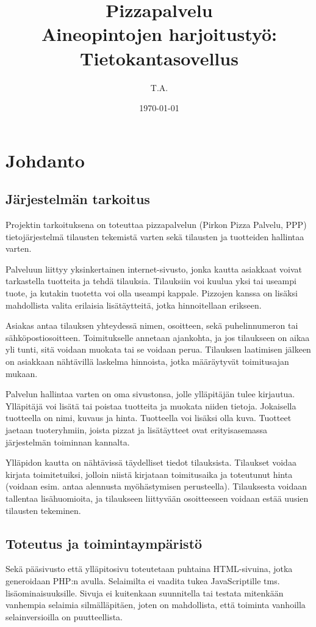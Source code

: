 \documentclass[a4paper, 12pt, finnish]{article}
\title{Pizzapalvelu\\
\large{Aineopintojen harjoitustyö: Tietokantasovellus}}
\author{T.A.}
\date{\today}
\begin{document}
\maketitle
\newpage

\section{Johdanto}
\subsection*{Järjestelmän tarkoitus}
Projektin tarkoituksena on toteuttaa pizzapalvelun (Pirkon Pizza Palvelu, PPP) tietojärjestelmä tilausten tekemistä varten sekä tilausten ja tuotteiden hallintaa varten.

Palveluun liittyy yksinkertainen internet-sivusto, jonka kautta asiakkaat voivat tarkastella tuotteita ja tehdä tilauksia. Tilauksiin voi kuulua yksi tai useampi tuote, ja kutakin tuotetta voi olla useampi kappale. Pizzojen kanssa on lisäksi mahdollista valita erilaisia lisätäytteitä, jotka hinnoitellaan erikseen.

Asiakas antaa tilauksen yhteydessä nimen, osoitteen, sekä puhelinnumeron tai sähköpostiosoitteen. Toimitukselle annetaan ajankohta, ja jos tilaukseen on aikaa yli tunti, sitä voidaan muokata tai se voidaan perua. Tilauksen laatimisen jälkeen on asiakkaan nähtävillä laskelma hinnoista, jotka määräytyvät toimitusajan mukaan.

Palvelun hallintaa varten on oma sivustonsa, jolle ylläpitäjän tulee kirjautua. Ylläpitäjä voi lisätä tai poistaa tuotteita ja muokata niiden tietoja. Jokaisella tuotteella on nimi, kuvaus ja hinta. Tuotteella voi lisäksi olla kuva. Tuotteet jaetaan tuoteryhmiin, joista pizzat ja lisätäytteet ovat erityisasemassa järjestelmän toiminnan kannalta.

Ylläpidon kautta on nähtävissä täydelliset tiedot tilauksista. Tilaukset voidaa kirjata toimitetuiksi, jolloin niistä kirjataan toimitusaika ja toteutunut hinta (voidaan esim. antaa alennusta myöhästymisen perusteella). Tilauksesta voidaan tallentaa lisähuomioita, ja tilaukseen liittyvään osoitteeseen voidaan estää uusien tilausten tekeminen.

\subsection*{Toteutus ja toimintaympäristö}

Sekä pääsivusto että ylläpitosivu toteutetaan puhtaina HTML-sivuina, jotka generoidaan PHP:n avulla. Selaimilta ei vaadita tukea JavaScriptille tms. lisäominaisuuksille. Sivuja ei kuitenkaan suunnitella tai testata mitenkään vanhempia selaimia silmälläpitäen, joten on mahdollista, että toiminta vanhoilla selainversioilla on puutteellista. 
\end{document}
